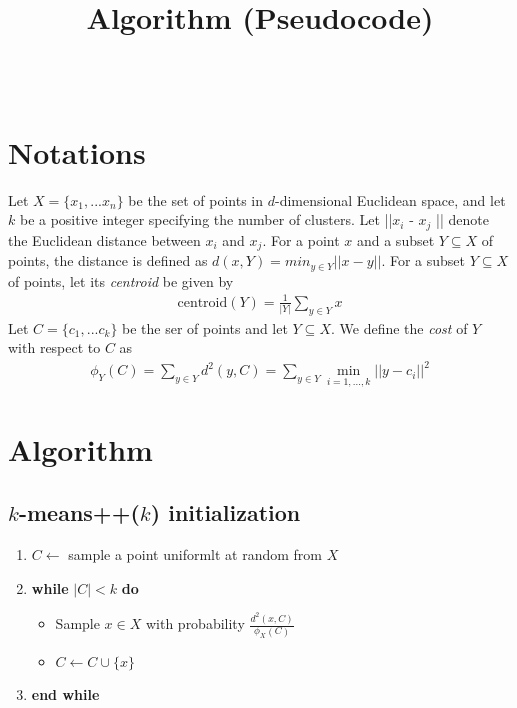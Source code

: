 \documentclass[fontsize=11pt]{scrartcl}
\title{	
\normalfont \normalsize 
\horrule{0.5pt} \\[0.4cm]
\huge Algorithm (Pseudocode) \\
\horrule{2pt} \\[0.1cm]
}
\numberwithin{equation}{section}
\numberwithin{figure}{section}
\numberwithin{table}{section}
\begin{document}
\date{}
\maketitle %


\section*{Notations}

Let $X =\{x_1,...x_n\}$ be the set of points in $d$-dimensional Euclidean space, and let $k$ be a positive integer specifying the number of clusters. Let ||$x_i$ - $x_j$ || denote the Euclidean distance between $x_i$ and $x_j$. For a point $x$ and a subset $Y \subseteq X$ of points, the distance is defined as $d(x,Y) = min_{y \in Y} ||x - y||$. For a subset $Y \subseteq X$ of points, let its \textit{centroid} be given by
\begin{equation*}
\begin{split}
    \text{centroid}(Y) = \frac{1}{|Y|}\sum_{y \in Y} x
\end{split}
\end{equation*}
Let $C =\{c_1,...c_k\}$ be the ser of points and let $Y \subseteq X$. We define the \textit{cost} of $Y$ with respect to $C$ as
\begin{equation*}
\begin{split}
    \phi_Y(C) = \sum_{y \in Y} d^2(y,C) = \sum_{y \in Y} \min_{i=1,...,k}||y-c_i||^2
\end{split}
\end{equation*}



\section*{Algorithm}


\subsection*{\textbf{$k$-means++($k$) initialization}}
\begin{enumerate}
	\item $C \leftarrow$ sample a point uniformlt at random from $X$ 
	\item \textbf{while} $|C|<k$ \textbf{do}
		\begin{itemize}
		\item Sample $x \in X$ with probability $\frac{d^2(x,C)}{\phi_X(C)}$
		\item $C \leftarrow C \cup \{x\}$ 
		\end{itemize}
	\item \textbf{end while} 
\end{enumerate}
\end{document}
